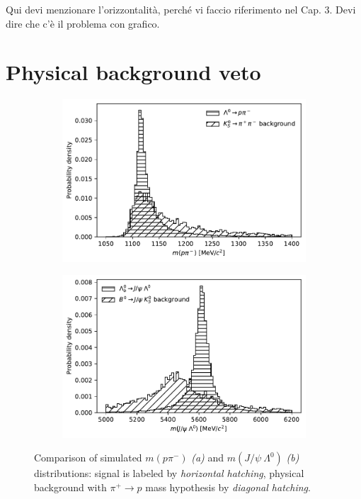 Qui devi menzionare l'orizzontalità, perché vi faccio riferimento nel Cap. 3. Devi dire che c'è il problema con grafico.

\section{Physical background veto}
\label{sec:B0_veto}
\begin{figure}[t]
	\centering
	\begin{subfigure}{.45\textwidth}
		\includegraphics[width=\textwidth]{graphics/04-event_selection/phys_bkg_lambda_comparison.pdf}
		\caption{}
	\end{subfigure}
	\begin{subfigure}{.45\textwidth}
		\includegraphics[width=\textwidth]{graphics/04-event_selection/phys_bkg_lambdab_comparison.pdf}
		\caption{}
	\end{subfigure}
	\caption{Comparison of simulated $m(p\pi^-)$ \textit{(a)} and $m(J/\psi~\Lambda^0)$ \textit{(b)} distributions: \demonstratorshort signal is labeled by \textit{horizontal hatching}, \physbkgshort physical background with $\pi^+ \rightarrow p$ mass hypothesis by \textit{diagonal hatching}.}
\end{figure}

